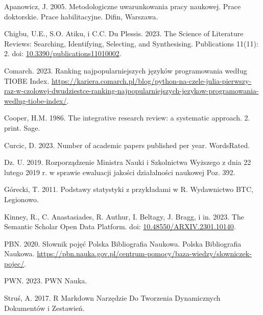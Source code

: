 \documentclass[
  12pt,
]{article}
\newlength{\cslhangindent}
\newlength{\cslentryspacingunit} %
\newenvironment{CSLReferences}[2] %
 {%
  \setlength{\parindent}{0pt}
  \ifodd #1
  \let\oldpar\par
  \def\par{\hangindent=\cslhangindent\oldpar}
  \fi
  \setlength{\parskip}{#2\cslentryspacingunit}
 }%
 {}
\begin{document}
\hypertarget{refs}{}
\begin{CSLReferences}{1}{0}
\leavevmode{}%
Apanowicz, J. 2005. Metodologiczne uwarunkowania pracy naukowej. Prace
doktorskie. Prace habilitacyjne. Difin, Warszawa.

\leavevmode{}%
Chigbu, U.E., S.O. Atiku, i C.C. Du Plessis. 2023. The Science of
Literature Reviews: Searching, Identifying, Selecting, and Synthesising.
Publications 11(11): 2. doi:
\href{https://doi.org/10.3390/publications11010002}{10.3390/publications11010002}.

\leavevmode{}%
Comarch. 2023. Ranking najpopularniejszych języków programowania według
TIOBE Index.
\url{https://kariera.comarch.pl/blog/python-na-czele-julia-pierwszy-raz-w-czolowej-dwudziestce-ranking-najpopularniejszych-jezykow-programowania-wedlug-tiobe-index/}.

\leavevmode{}%
Cooper, H.M. 1986. The integrative research review: a systematic
approach. 2. print. Sage.

\leavevmode{}%
Curcic, D. 2023. Number of academic papers published per year.
WordsRated.

\leavevmode{}%
Dz. U. 2019. Rozporz{ą}dzenie Ministra Nauki i Szkolnictwa Wy{ż}szego z
dnia 22 lutego 2019 r. w sprawie ewaluacji jako{ś}ci dzia{ł}alno{ś}ci
naukowej Poz. 392.

\leavevmode{}%
Górecki, T. 2011. Podstawy statystyki z przyk{ł}adami w R. Wydawnictwo
BTC, Legionowo.

\leavevmode{}%
Kinney, R., C. Anastasiades, R. Authur, I. Beltagy, J. Bragg, i in.
2023. The Semantic Scholar Open Data Platform. doi:
\href{https://doi.org/10.48550/ARXIV.2301.10140}{10.48550/ARXIV.2301.10140}.

\leavevmode{}%
PBN. 2020. Słownik pojęć Polska Bibliografia Naukowa. Polska
Bibliografia Naukowa.
\url{https://pbn.nauka.gov.pl/centrum-pomocy/baza-wiedzy/slowniczek-pojec/}.

\leavevmode{}%
PWN. 2023. PWN Nauka.

\leavevmode{}%
Struś, A. 2017. R {Markdown} Narzędzie Do Tworzenia Dynamicznych
Dokumentów i Zestawień.


\end{CSLReferences}
\end{document}
